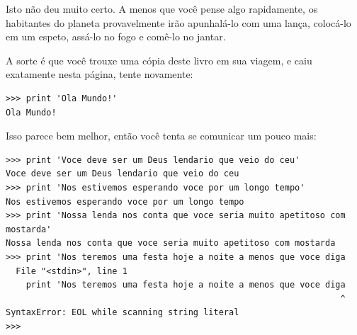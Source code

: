 Isto não deu muito certo. A menos que você pense algo rapidamente,
os habitantes do planeta provavelmente irão apunhalá-lo com uma lança,
colocá-lo em um espeto, assá-lo no fogo e comê-lo no jantar.
%

A sorte é que você trouxe uma cópia deste livro em sua viagem, e caiu
exatamente nesta página, tente novamente:
%

\beforeverb
\begin{verbatim}
>>> print 'Ola Mundo!'
Ola Mundo!
\end{verbatim}
\afterverb


Isso parece bem melhor, então você tenta se comunicar um pouco
mais:
%

\beforeverb
\begin{verbatim}
>>> print 'Voce deve ser um Deus lendario que veio do ceu'
Voce deve ser um Deus lendario que veio do ceu
>>> print 'Nos estivemos esperando voce por um longo tempo'
Nos estivemos esperando voce por um longo tempo
>>> print 'Nossa lenda nos conta que voce seria muito apetitoso com mostarda'
Nossa lenda nos conta que voce seria muito apetitoso com mostarda
>>> print 'Nos teremos uma festa hoje a noite a menos que voce diga
  File "<stdin>", line 1
    print 'Nos teremos uma festa hoje a noite a menos que voce diga
                                                                  ^
SyntaxError: EOL while scanning string literal
>>>
\end{verbatim}
\afterverb


